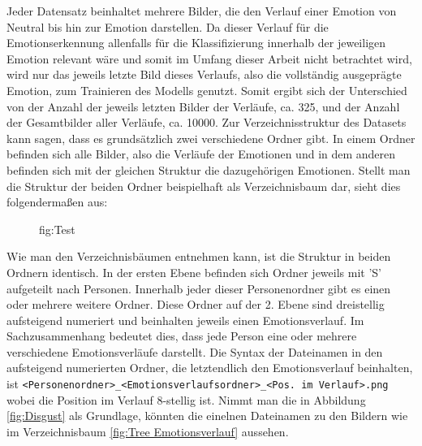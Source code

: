 \documentclass[12pt, a4paper]{scrbook}
\begin{document}
Jeder Datensatz beinhaltet mehrere Bilder, die den Verlauf einer Emotion von Neutral bis hin zur Emotion darstellen. Da dieser Verlauf für die Emotionserkennung allenfalls für die Klassifizierung innerhalb der jeweiligen Emotion relevant wäre und somit im Umfang dieser Arbeit nicht betrachtet wird, wird nur das jeweils letzte Bild dieses Verlaufs, also die vollständig ausgeprägte Emotion, zum Trainieren des Modells genutzt. Somit ergibt sich der Unterschied von der Anzahl der jeweils letzten Bilder der Verläufe, ca. 325, und der Anzahl der Gesamtbilder aller Verläufe, ca. 10000.
Zur Verzeichnisstruktur des Datasets kann sagen, dass es grundsätzlich zwei verschiedene Ordner gibt. In einem Ordner befinden sich alle Bilder, also die Verläufe der Emotionen und in dem anderen befinden sich mit der gleichen Struktur die dazugehörigen Emotionen. Stellt man die Struktur der beiden Ordner beispielhaft als Verzeichnisbaum dar, sieht dies folgendermaßen aus:
\setlength{\DTbaselineskip}{20pt}
\DTsetlength{1em}{1.5em}{0.2em}{1pt}{4pt}
\renewcommand*\DTstylecomment{\rmfamily\color{commentgreen}\textsc}
\renewcommand*\DTstyle{\ttfamily\textcolor{red}}
\begin{figure}
\begin{minipage}[b]{.5\linewidth}
\end{minipage}
\begin{minipage}[b]{.5\linewidth}
\end{minipage}
\caption{fig:Test}
\end{figure}
Wie man den Verzeichnisbäumen entnehmen kann, ist die Struktur in beiden Ordnern identisch. In der ersten Ebene befinden sich Ordner jeweils mit 'S' aufgeteilt nach Personen. Innerhalb jeder dieser Personenordner gibt es einen oder mehrere weitere Ordner. Diese Ordner auf der 2. Ebene sind dreistellig aufsteigend numeriert und beinhalten jeweils einen Emotionsverlauf. Im Sachzusammenhang bedeutet dies, dass jede Person eine oder mehrere verschiedene Emotionsverläufe darstellt. Die Syntax der Dateinamen in den aufsteigend numerierten Ordner, die letztendlich den Emotionsverlauf beinhalten, ist \texttt{<Personenordner>\_<Emotionsverlaufsordner>\_<Pos. im Verlauf>.png} wobei die Position im Verlauf 8-stellig ist. Nimmt man die in Abbildung \ref{fig:Disgust} als Grundlage, könnten die einelnen Dateinamen zu den Bildern wie im Verzeichnisbaum \ref{fig:Tree Emotionsverlauf} aussehen.
\end{document}
